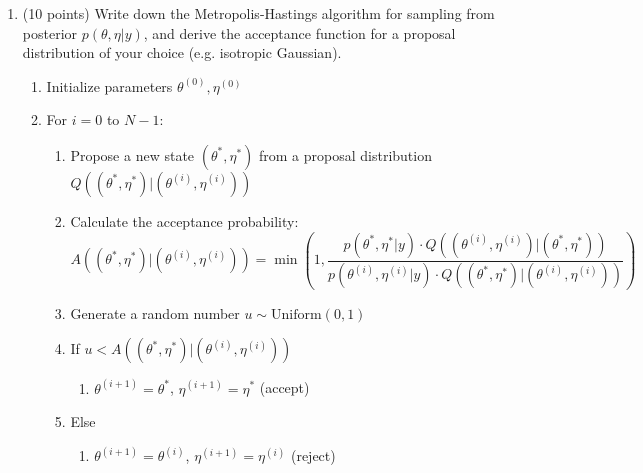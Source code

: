\documentclass{article}
\begin{document}
\begin{enumerate}
    where $\tau_0 = \tau_1 = 0.0001$ and $\alpha = \beta = 0.1$.
    
   so, our joint likelihood is:
    \[
        p(y, \theta, \eta) = 
        \prod_{g=0}^{379} \left[\frac{e^{-\theta_{g1}}\theta_{g1}^{y_{g1}}}{y_{g1}!} \cdot \frac{e^{-\theta_{g2}}\theta_{g2}^{y_{g2}}}{y_{g2}!}\right] 
        \times \mathcal{N}(\text{home}; 0, \tau_0^{-1}) 
        \times \prod_{t=1}^{19} \mathcal{N}(\text{att}_t; \mu_{\text{att}}, \tau_{\text{att}}^{-1}) 
        \times \prod_{t=1}^{19} \mathcal{N}(\text{def}_t; \mu_{\text{def}}, \tau_{\text{def}}^{-1})
        \times \mathcal{N}(\mu_{\text{att}}; 0, \tau_1^{-1}) 
        \times \mathcal{N}(\mu_{\text{def}}; 0, \tau_1^{-1}) 
        \times \text{Gamma}(\tau_{\text{att}}; \alpha, \beta)
        \times \text{Gamma}(\tau_{\text{def}}; \alpha, \beta)
    \]
    where $\tau_0 = 0.0001$ and $\alpha = \beta = 0.1$.

\item (10 points) Write down the Metropolis-Hastings algorithm for sampling from posterior $p(\theta, \eta|y)$, and derive the acceptance function for a proposal distribution of your choice (e.g. isotropic Gaussian).


\begin{enumerate}
    \item Initialize parameters $\theta^{(0)}, \eta^{(0)}$
    \item For $i = 0$ to $N-1$:
    \begin{enumerate}
        \item Propose a new state $(\theta^*, \eta^*)$ from a proposal distribution $Q((\theta^*, \eta^*) | (\theta^{(i)}, \eta^{(i)}))$
        \item Calculate the acceptance probability:
        \[
            A((\theta^*, \eta^*) | (\theta^{(i)}, \eta^{(i)})) = \min\left(1, \frac{p(\theta^*, \eta^* | y) \cdot Q((\theta^{(i)}, \eta^{(i)}) | (\theta^*, \eta^*))}{p(\theta^{(i)}, \eta^{(i)} | y) \cdot Q((\theta^*, \eta^*) | (\theta^{(i)}, \eta^{(i)}))}\right)
        \]
        \item Generate a random number $u \sim \text{Uniform}(0, 1)$
        \item If $u < A((\theta^*, \eta^*) | (\theta^{(i)}, \eta^{(i)}))$
        \begin{enumerate}
            \item $\theta^{(i+1)} = \theta^*$, $\eta^{(i+1)} = \eta^*$ (accept)
        \end{enumerate}
        \item Else
        \begin{enumerate}
            \item $\theta^{(i+1)} = \theta^{(i)}$, $\eta^{(i+1)} = \eta^{(i)}$ (reject)
        \end{enumerate}
    \end{enumerate}
\end{enumerate}


\end{enumerate}
\end{document}
